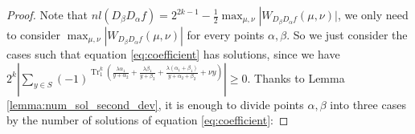 \documentclass{article}
\newcommand{\F}{\mathbb{F}}
\newcommand{\0}{\textbf{0}}
\newcommand{\1}{\textbf{1}}
\newcommand{\TRACE}{\operatorname{Tr}_1^k}
\theoremstyle{plain}
\begin{document}
\begin{proof}
    Note that  $ nl(D_{\beta}D_{\alpha}f)=2^{2k-1}-\frac{1}{2}\max_{\mu,\nu}\left\lvert W_{D_{\beta}D_{\alpha}f}(\mu,\nu)\rvert\right. $, 
    we only need to consider $ \max_{\mu,\nu}|W_{D_{\beta}D_{\alpha}f}(\mu,\nu)| $ for every points $ \alpha,\beta $. 
    So we just consider the cases such that equation \eqref{eq:coefficient} has solutions, since we have 
    $ 2^k\left\lvert \sum_{y\in S}(-1)^{\TRACE\left(\frac{\lambda\alpha_1}{y+\alpha_2}+\frac{\lambda\beta_1}{y+\beta_2}+\frac{\lambda(\alpha_1+\beta_1)}{y+\alpha_2+\beta_2}+\nu y\right)}\right\rvert \ge 0 $.
    Thanks to Lemma \ref{lemma:num_sol_second_dev}, it is enough to divide points $ \alpha,\beta $ into three cases by the number of solutions 
    of equation \eqref{eq:coefficient}: 

    
    
    

\end{proof}
\end{document}
